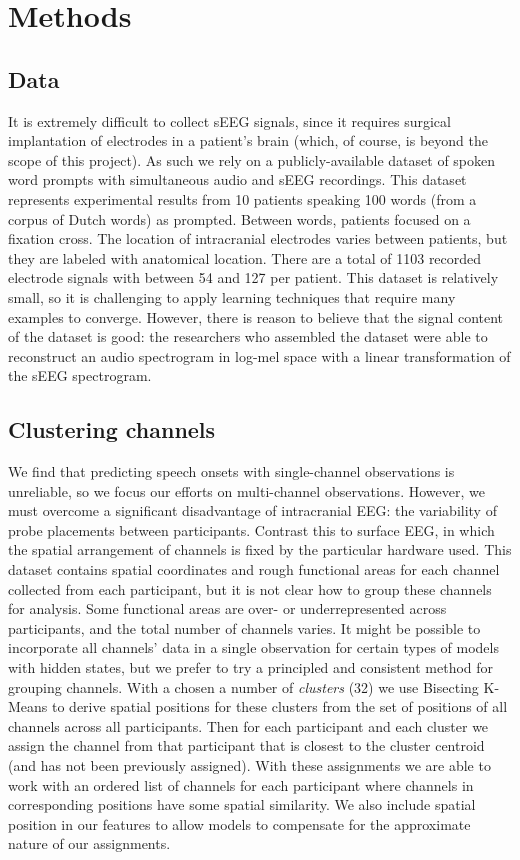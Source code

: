 \documentclass[format=sigconf, nonacm=true, review=true, screen=true]{acmart}
\begin{document}
\section{Methods}

\subsection{Data}

It is extremely difficult to collect sEEG signals, since it requires surgical implantation of electrodes in a patient's brain (which, of course, is beyond the scope of this project). As such we rely on a publicly-available dataset of spoken word prompts with simultaneous audio and sEEG recordings. \cite{verwoert2022dataset} This dataset represents experimental results from 10 patients speaking 100 words (from a corpus of Dutch words) as prompted. Between words, patients focused on a fixation cross. The location of intracranial electrodes varies between patients, but they are labeled with anatomical location. There are a total of 1103 recorded electrode signals with between 54 and 127 per patient. This dataset is relatively small, so it is challenging to apply learning techniques that require many examples to converge. However, there is reason to believe that the signal content of the dataset is good: the researchers who assembled the dataset were able to reconstruct an audio spectrogram in log-mel space with a linear transformation of the sEEG spectrogram.

\subsection{Clustering channels}

We find that predicting speech onsets with single-channel observations is unreliable, so we focus our efforts on multi-channel observations. However, we must overcome a significant disadvantage of intracranial EEG: the variability of probe placements between participants. Contrast this to surface EEG, in which the spatial arrangement of channels is fixed by the particular hardware used. This dataset contains spatial coordinates and rough functional areas for each channel collected from each participant, but it is not clear how to group these channels for analysis. Some functional areas are over- or underrepresented across participants, and the total number of channels varies. It might be possible to incorporate all channels' data in a single observation for certain types of models with hidden states, but we prefer to try a principled and consistent method for grouping channels. With a chosen a number of \textit{clusters} (32) we use Bisecting K-Means to derive spatial positions for these clusters from the set of positions of all channels across all participants. Then for each participant and each cluster we assign the channel from that participant that is closest to the cluster centroid (and has not been previously assigned). With these assignments we are able to work with an ordered list of channels for each participant where channels in corresponding positions have some spatial similarity. We also include spatial position in our features to allow models to compensate for the approximate nature of our assignments.
\end{document}
